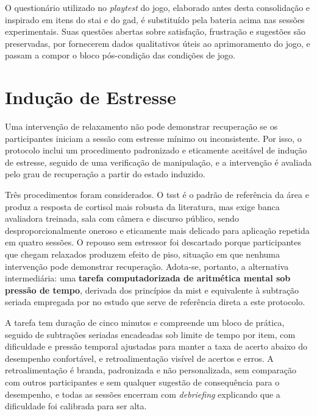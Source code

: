 O questionário utilizado no \textit{playtest} do jogo, elaborado antes desta consolidação e inspirado em itens do \gls{stai} e do \gls{gad}, é substituído pela bateria acima nas sessões experimentais. Suas questões abertas sobre satisfação, frustração e sugestões são preservadas, por fornecerem dados qualitativos úteis ao aprimoramento do jogo, e passam a compor o bloco pós-condição das condições de jogo.

\section{Indução de Estresse}\label{sec:inducao}

Uma intervenção de relaxamento não pode demonstrar recuperação se os participantes iniciam a sessão com estresse mínimo ou inconsistente. Por isso, o protocolo inclui um procedimento padronizado e eticamente aceitável de indução de estresse, seguido de uma verificação de manipulação, e a intervenção é avaliada pelo grau de recuperação a partir do estado induzido.

Três procedimentos foram considerados. O \gls{tsst} \citep{Kirschbaum1993} é o padrão de referência da área e produz a resposta de cortisol mais robusta da literatura, mas exige banca avaliadora treinada, sala com câmera e discurso público, sendo desproporcionalmente oneroso e eticamente mais delicado para aplicação repetida em quatro sessões. O repouso sem estressor foi descartado porque participantes que chegam relaxados produzem efeito de piso, situação em que nenhuma intervenção pode demonstrar recuperação. Adota-se, portanto, a alternativa intermediária: uma \textbf{tarefa computadorizada de aritmética mental sob pressão de tempo}, derivada dos princípios da \gls{mist} \citep{Dedovic2005} e equivalente à subtração seriada empregada por \citet{Kim2021} no estudo que serve de referência direta a este protocolo.

A tarefa tem duração de cinco minutos e compreende um bloco de prática, seguido de subtrações seriadas encadeadas sob limite de tempo por item, com dificuldade e pressão temporal ajustadas para manter a taxa de acerto abaixo do desempenho confortável, e retroalimentação visível de acertos e erros. A retroalimentação é branda, padronizada e não personalizada, sem comparação com outros participantes e sem qualquer sugestão de consequência para o desempenho, e todas as sessões encerram com \textit{debriefing} explicando que a dificuldade foi calibrada para ser alta.

